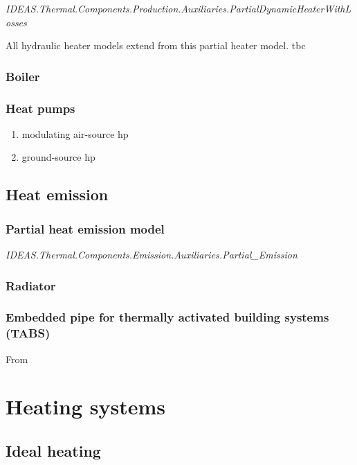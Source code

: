 \emph{IDEAS.Thermal.Components.Production.Auxiliaries.PartialDynamicHeaterWithLosses}

\vspace{6mm}

All hydraulic heater models extend from this partial heater model.  
tbc

\subsubsection{Boiler}

\subsubsection{Heat pumps}

\begin{enumerate}
	\item modulating air-source hp
	\item ground-source hp
\end{enumerate}

\subsection{Heat emission}

\subsubsection{Partial heat emission model}

\emph{IDEAS.Thermal.Components.Emission.Auxiliaries.Partial_Emission}
\vspace{6mm}

\subsubsection{Radiator}

\subsubsection{Embedded pipe for thermally activated building systems (TABS)}

From ~\cite{Koschenz2000}

\section{Heating systems}

\subsection{Ideal heating}

